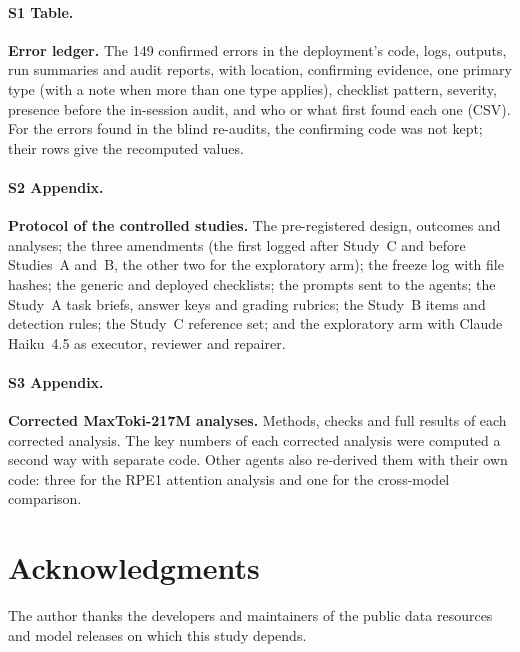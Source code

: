\paragraph*{S1 Table.}
\label{S1_Table}
{\bf Error ledger.} The 149 confirmed errors in the deployment's code,
logs, outputs, run summaries and audit reports, with location,
confirming evidence, one primary type (with a note when more than one
type applies), checklist pattern, severity, presence before the
in-session audit, and who or what first found each one (CSV). For the errors
found in the blind re-audits, the confirming code was not kept; their
rows give the recomputed values.

\paragraph*{S2 Appendix.}
\label{S2_Appendix}
{\bf Protocol of the controlled studies.} The pre-registered design,
outcomes and analyses; the three amendments (the first logged after
Study~C and before Studies~A and~B, the other two for the exploratory
arm); the freeze log with file hashes; the generic and deployed
checklists; the prompts sent to the agents; the Study~A task briefs,
answer keys and grading rubrics; the Study~B items and detection rules;
the Study~C reference set; and the exploratory arm with Claude Haiku~4.5
as executor, reviewer and repairer.

\paragraph*{S3 Appendix.}
\label{S3_Appendix}
{\bf Corrected MaxToki-217M analyses.} Methods, checks and full results
of each corrected analysis. The key numbers of each corrected analysis
were computed a second way with separate code. Other agents also
re-derived them with their own code: three for the RPE1 attention
analysis and one for the cross-model comparison.

\section*{Acknowledgments}
The author thanks the developers and maintainers of the public data
resources and model releases on which this study depends.

\nolinenumbers




